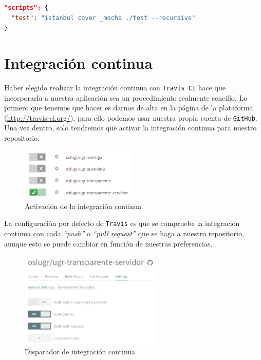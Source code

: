 \newpage
\begin{lstlisting}[language=json,caption={Scripts de test},label={lst:test}]
"scripts": {
  "test": "istanbul cover _mocha ./test --recursive"
}
\end{lstlisting}

\section{Integración continua}

Haber elegido realizar la integración continua con {\tt Travis CI} hace que incorporarla a nuestra aplicación sea un procedimiento realmente sencillo. Lo primero que tenemos que hacer es darnos de alta en la página de la plataforma (\url{http://travis-ci.org/}), para ello podemos usar nuestra propia cuenta de {\tt GitHub}. Una vez dentro, solo tendremos que activar la integración continua para nuestro repositorio.

\begin{figure}[!ht]
	\begin{center}
		\includegraphics[width=0.5\textwidth]{../images/activar_travis.png}
		\caption{Activación de la integración continua}
		\label{fig:activar_travis}
	\end{center}
\end{figure}

La configuración por defecto de {\tt Travis} es que se compruebe la integración continua con cada \textit{``push''} o \textit{``pull request''} que se haga a nuestro repositorio, aunque esto se puede cambiar en función de nuestras preferencias.

\begin{figure}[!ht]
	\begin{center}
		\includegraphics[width=0.6\textwidth]{../images/config_travis.png}
		\caption{Disparador de integración continua}
		\label{fig:config_travis}
	\end{center}
\end{figure}

